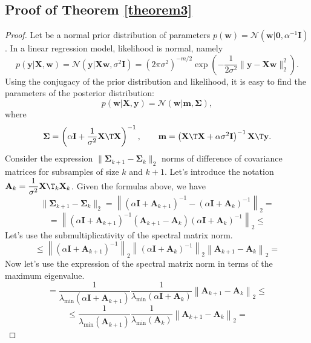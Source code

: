 \documentclass[sn-mathphys-num]{sn-jnl}%
\begin{document}
\begin{appendices}
\section{Proof of Theorem \ref{theorem3}}
\begin{proof}
Let be a normal prior distribution of parameters $p(\mathbf{w})=\mathcal{N}\left(\mathbf{w}|\mathbf{0}, \alpha^{-1}\mathbf{I}\right)$. In a linear regression model, likelihood is normal, namely
    \[ p(\mathbf{y} | \mathbf{X}, \mathbf{w}) = \mathcal{N}\left(\mathbf{y} |\mathbf{X}\mathbf{w}, \sigma^2\mathbf{I}\right) =\left( 2\pi\sigma^2\right)^{-m/2} \exp\left( -\dfrac{1}{2\sigma^2} \|\mathbf{y} - \mathbf{X}\mathbf{w}\|_2^2\right). \]
Using the conjugacy of the prior distribution and likelihood, it is easy to find the parameters of the posterior distribution:
    \[ p(\mathbf{w} | \mathbf{X}, \mathbf{y}) = \mathcal{N}\left(\mathbf{w} | \mathbf{m}, \mathbf{\Sigma} \right), \]
where
    \[ \mathbf{\Sigma} = \left( \alpha \mathbf{I} + \dfrac{1}{\sigma^2} \mathbf{X}\T \mathbf{X} \right)^{-1}, \qquad \mathbf{m} = \left( \mathbf{X}\T \mathbf{X} + \alpha \sigma^2 \mathbf{I} \right)^{-1} \mathbf{X}\T \mathbf{y}. \]
Consider the expression $\|\mathbf{\Sigma}_{k+1} - \mathbf{\Sigma}_k\|_2$ norms of difference of covariance matrices for subsamples of size $k$ and $k+1$. Let's introduce the notation $\mathbf{A}_k = \dfrac{1}{\sigma^2}\mathbf{X}\T_k\mathbf{X}_k$. Given the formulas above, we have
    \[ \| \mathbf{\Sigma}_{k+1} - \mathbf{\Sigma}_k \|_2 = \left\| \left( \alpha \mathbf{I} + \mathbf{A}_{k+1} \right)^{-1} - \left( \alpha \mathbf{I} + \mathbf{A}_k \right)^{-1} \right\|_2 = \]
    \[ = \left\| \left( \alpha \mathbf{I} + \mathbf{A}_{k+1} \right)^{-1} \left( \mathbf{A}_{k+1} - \mathbf{A}_k \right) \left( \alpha \mathbf{I} + \mathbf{A}_k \right)^{-1} \right\|_2 \leqslant \]
    Let's use the submultiplicativity of the spectral matrix norm.
    \[ \leqslant \left\| \left( \alpha \mathbf{I} + \mathbf{A}_{k+1} \right)^{-1} \right\|_2 \left\| \left( \alpha \mathbf{I} + \mathbf{A}_k \right)^{-1} \right\|_2 \left\| \mathbf{A}_{k+1} - \mathbf{A}_k \right\|_2 = \]
    Now let's use the expression of the spectral matrix norm in terms of the maximum eigenvalue.
    \[ = \dfrac{1}{\lambda_{\min}\left( \alpha \mathbf{I} + \mathbf{A}_{k+1} \right)} \dfrac{1}{\lambda_{\min}\left( \alpha \mathbf{I} + \mathbf{A}_k \right)} \left\| \mathbf{A}_{k+1} - \mathbf{A}_k \right\|_2 \leqslant \]
    \[ \leqslant \dfrac{1}{\lambda_{\min}\left( \mathbf{A}_{k+1} \right)} \dfrac{1}{\lambda_{\min}\left( \mathbf{A}_k \right)} \left\| \mathbf{A}_{k+1} - \mathbf{A}_k \right\|_2 = \]

\end{proof}
\end{appendices}
\end{document}
